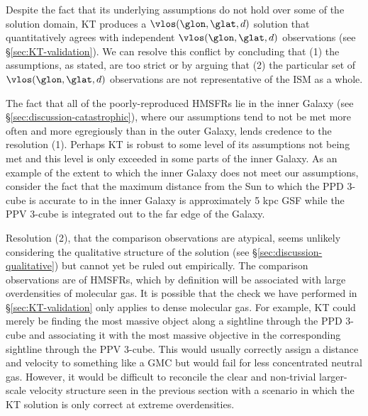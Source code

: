 Despite the fact that its underlying assumptions do not hold over some of the solution domain, KT produces a $\vlos(\glon, \glat, d)$ solution that quantitatively agrees with independent $\vlos(\glon, \glat, d)$ observations (see \S \ref{sec:KT-validation}).
We can resolve this conflict by concluding that (1) the assumptions, as stated, are too strict or by arguing that (2) the particular set of $\vlos(\glon, \glat, d)$ observations are not representative of the ISM as a whole.

The fact that all of the poorly-reproduced HMSFRs lie in the inner Galaxy (see \S \ref{sec:discussion-catastrophic}), where our assumptions tend to not be met more often and more egregiously than in the outer Galaxy, lends credence to the resolution (1). 
Perhaps KT is robust to some level of its assumptions not being met and this level is only exceeded in some parts of the inner Galaxy. 
As an example of the extent to which the inner Galaxy does not meet our assumptions, consider the fact that the maximum distance from the Sun to which the PPD 3-cube is accurate to in the inner Galaxy is approximately 5 kpc GSF while the PPV 3-cube is integrated out to the far edge of the Galaxy. 

Resolution (2), that the comparison observations are atypical, seems unlikely considering the qualitative structure of the solution (see \S \ref{sec:discussion-qualitative}) but cannot yet be ruled out empirically. 
The comparison observations are of HMSFRs, which by definition will be associated with large overdensities of molecular gas. 
It is possible that the check we have performed in \S \ref{sec:KT-validation} only applies to dense molecular gas.
For example, KT could merely be finding the most massive object along a sightline through the PPD 3-cube and associating it with the most massive objective in the corresponding sightline through the PPV 3-cube. 
This would usually correctly assign a distance and velocity to something like a GMC but would fail for less concentrated neutral gas. 
However, it would be difficult to reconcile the clear and non-trivial larger-scale velocity structure seen in the previous section with a scenario in which the KT solution is only correct at extreme overdensities. 


